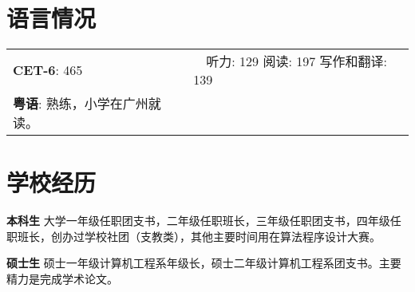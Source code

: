 \documentclass[letterpaper,11pt]{article}
\begin{document}
\section{语言情况}

\begin{tabular}{ll}
\textbf{CET-6}: 465       &   \ \  听力: 129  \quad  阅读: 197  \quad   写作和翻译: 139 \\
\textbf{粤语}: 熟练，小学在广州就读。 \\
\end{tabular}

\section{学校经历}

\begin{CV}
\item[\bf 本科生] 大学一年级任职团支书，二年级任职班长，三年级任职团支书，四年级任职班长，创办过学校社团（支教类），其他主要时间用在算法程序设计大赛。
\item[\bf 硕士生] 硕士一年级计算机工程系年级长，硕士二年级计算机工程系团支书。主要精力是完成学术论文。
\end{CV}
\end{document}
